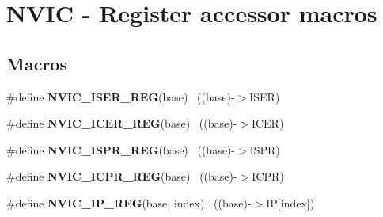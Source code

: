 \hypertarget{group___n_v_i_c___register___accessor___macros}{}\section{N\+V\+I\+C -\/ Register accessor macros}
\label{group___n_v_i_c___register___accessor___macros}
\subsection*{Macros}
\begin{DoxyCompactItemize}
\item 
\hypertarget{group___n_v_i_c___register___accessor___macros_gadae5c656372b79c05561b75a5dee27f4}{}\#define {\bfseries N\+V\+I\+C\+\_\+\+I\+S\+E\+R\+\_\+\+R\+E\+G}(base)                                        ~((base)-\/$>$I\+S\+E\+R)\label{group___n_v_i_c___register___accessor___macros_gadae5c656372b79c05561b75a5dee27f4}

\item 
\hypertarget{group___n_v_i_c___register___accessor___macros_gab9589754272d54d3d5c8f5c6d73da426}{}\#define {\bfseries N\+V\+I\+C\+\_\+\+I\+C\+E\+R\+\_\+\+R\+E\+G}(base)                                        ~((base)-\/$>$I\+C\+E\+R)\label{group___n_v_i_c___register___accessor___macros_gab9589754272d54d3d5c8f5c6d73da426}

\item 
\hypertarget{group___n_v_i_c___register___accessor___macros_gafe718485cb95307e1542f605b7b0b706}{}\#define {\bfseries N\+V\+I\+C\+\_\+\+I\+S\+P\+R\+\_\+\+R\+E\+G}(base)                                        ~((base)-\/$>$I\+S\+P\+R)\label{group___n_v_i_c___register___accessor___macros_gafe718485cb95307e1542f605b7b0b706}

\item 
\hypertarget{group___n_v_i_c___register___accessor___macros_ga8854a65e44c962adc43ed92d019916ac}{}\#define {\bfseries N\+V\+I\+C\+\_\+\+I\+C\+P\+R\+\_\+\+R\+E\+G}(base)                                        ~((base)-\/$>$I\+C\+P\+R)\label{group___n_v_i_c___register___accessor___macros_ga8854a65e44c962adc43ed92d019916ac}

\item 
\hypertarget{group___n_v_i_c___register___accessor___macros_gac7b3df65f95ff3ad60a655db439a45a2}{}\#define {\bfseries N\+V\+I\+C\+\_\+\+I\+P\+\_\+\+R\+E\+G}(base,  index)                                ~((base)-\/$>$I\+P\mbox{[}index\mbox{]})\label{group___n_v_i_c___register___accessor___macros_gac7b3df65f95ff3ad60a655db439a45a2}


\end{DoxyCompactItemize}
